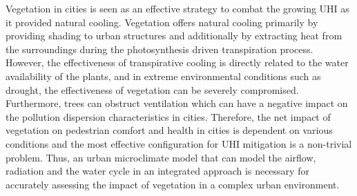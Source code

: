 
Vegetation in cities is seen as an effective strategy to combat the growing UHI as it provided natural cooling. Vegetation offers natural cooling primarily by providing shading to urban structures and additionally by extracting heat from the surroundings during the photosynthesis driven transpiration process. However, the effectiveness of transpirative cooling is directly related to the water availability of the plants, and in extreme environmental conditions such as drought, the effectiveness of vegetation can be severely compromised. Furthermore, trees can obstruct ventilation which can have a negative impact on the pollution dispersion characteristics in cities. Therefore, the net impact of vegetation on pedestrian comfort and health in cities is dependent on various conditions and the most effective configuration for UHI mitigation is a non-trivial problem. Thus, an urban microclimate model that can model the airflow, radiation and the water cycle in an integrated approach is necessary for accurately assessing the impact of vegetation in a complex urban environment.

